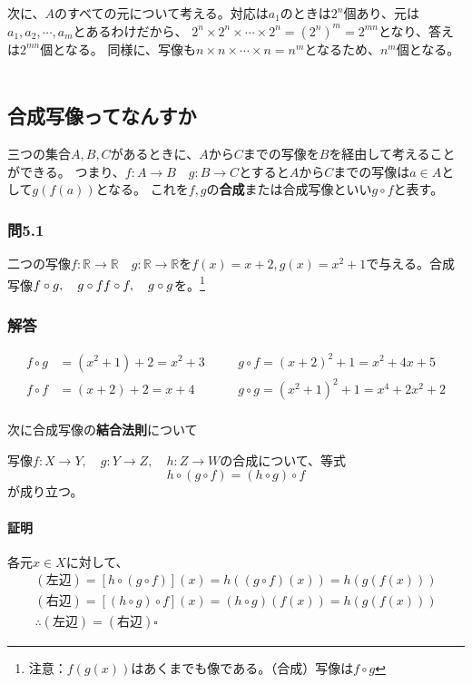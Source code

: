 \documentclass[a4j,dvipdfmx]{jsarticle}
\begin{document}
次に、$A$のすべての元について考える。対応は$a_1$のときは$2^n$個あり、元は$a_1,a_2,\cdots,a_m$とあるわけだから、
$2^n\times 2^n\times\cdots\times 2^n=(2^n)^m=2^{mn}$となり、答えは$2^{mn}$個となる。
同様に、写像も$n\times n\times\cdots\times n=n^m$となるため、$n^m$個となる。\\\\
\color{black}
\newpage
\subsection{合成写像ってなんすか}
三つの集合$A,B,C$があるときに、$A$から$C$までの写像を$B$を経由して考えることができる。
つまり、$f:A\to B\quad g:B\to C$とすると$A$から$C$までの写像は$a\in A$として$g(f(a))$となる。
これを$f,g$の\textbf{合成}または$\textbf{合成写像}$といい$g\circ f$と表す。

\subsubsection*{問5.1}
二つの写像$f:\mathbb{R}\to\mathbb{R}\quad g:\mathbb{R}\to\mathbb{R}$を$f(x)=x+2,g(x)=x^2+1$で与える。合成写像$f\circ g,\quad g\circ f\\f\circ f,\quad g\circ g$を。\footnote{注意：$f(g(x))$はあくまでも像である。（合成）写像は$f\circ g$}
\vspace{30mm}

\subsubsection*{解答}
\color{red}
\begin{align*}
    f\circ g&=(x^2+1)+2=x^2+3\quad && g\circ f=(x+2)^2+1=x^2+4x+5\\
    f\circ f&=(x+2)+2=x+4\quad && g\circ g=(x^2+1)^2+1=x^4+2x^2+2\\
\end{align*}
\color{black}

次に合成写像の\textbf{結合法則}について
\begin{screen}
    写像$f:X\to Y,\quad g:Y\to Z,\quad h:Z\to W$の合成について、等式
    \begin{equation*}
        h\circ (g\circ f)=(h\circ g)\circ f
    \end{equation*}
    が成り立つ。
\end{screen}
\paragraph{証明}
各元$x\in X$に対して、
\begin{align*}
    (\text{左辺})=[h\circ (g\circ f)](x)=h((g\circ f)(x))=h(g(f(x)))\\
    (\text{右辺})=[(h\circ g)\circ f](x)=(h\circ g)(f(x))=h(g(f(x)))\\
    \therefore (\text{左辺})=(\text{右辺})\square
\end{align*} 
\newpage
\end{document}
